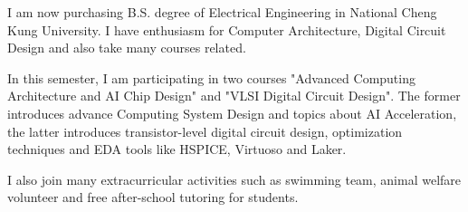 

\begin{cvparagraph}

    I am now purchasing B.S. degree of Electrical Engineering in National Cheng Kung University. I have enthusiasm for Computer Architecture, Digital Circuit Design and also take many courses related.

    In this semester, I am participating in two courses "Advanced Computing Architecture and AI Chip Design" and "VLSI Digital Circuit Design". The former introduces advance Computing System Design and topics about AI Acceleration, the latter introduces transistor-level digital circuit design, optimization techniques and EDA tools like HSPICE, Virtuoso and Laker.

    I also join many extracurricular activities such as swimming team, animal welfare volunteer and free after-school tutoring for students.
\end{cvparagraph}
